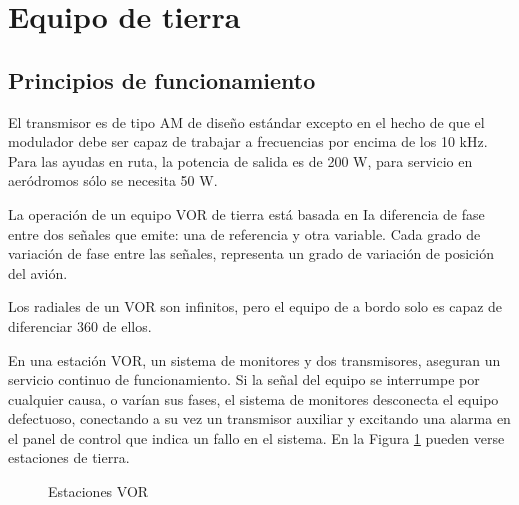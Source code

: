 \section{Equipo de tierra}

\subsection{Principios de funcionamiento }

El transmisor es de tipo AM de diseño estándar excepto en el hecho de que el modulador debe ser capaz de trabajar a  frecuencias por encima de los 10 kHz. Para las ayudas en ruta, la potencia de salida es de 200 W, para servicio en aeródromos sólo se necesita 50 W.

La operación de un equipo VOR de tierra está basada en Ia diferencia de fase entre dos señales que emite: una de referencia y otra variable. Cada grado de variación de fase entre las señales, representa un grado de variación de posición del avión.

Los radiales de un VOR son infinitos, pero el equipo de a bordo solo es capaz de diferenciar 360 de ellos.

En una estación VOR, un sistema de monitores y dos transmisores, aseguran un servicio continuo de funcionamiento. Si la señal del equipo se interrumpe por cualquier causa, o varían sus fases, el sistema de monitores desconecta el equipo defectuoso, conectando a su vez un transmisor auxiliar y excitando una alarma en el panel de control que indica un fallo en el sistema. En la Figura \ref{fig:estaciones_VOR}  pueden verse estaciones de tierra. 

\begin{figure}[!htb]
  \centering
  \caption{Estaciones VOR}\label{fig:estaciones_VOR}
\end{figure}


